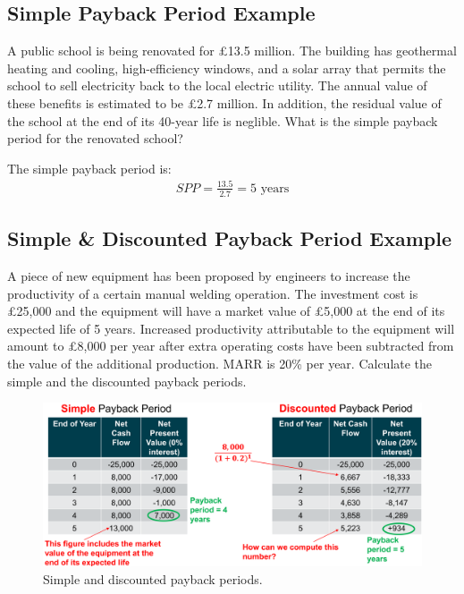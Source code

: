 \documentclass[class=report, crop=false, 12pt,a4paper]{standalone}
\begin{document}
\subsection{Simple Payback Period Example}
A public school is being renovated for £13.5 million. The building has geothermal heating and cooling, high-efficiency windows, and a solar array that permits the school to sell electricity back to the local electric utility. The annual value of these benefits is estimated to be £2.7 million. In addition, the residual value of the school at the end of its 40-year life is neglible. What is the simple payback period for the renovated school?

The simple payback period is:
\begin{gather}
	SPP = \frac{13.5}{2.7} = 5 \textrm{ years}
\end{gather}
\subsection{Simple \& Discounted Payback Period Example}
A piece of new equipment has been proposed by engineers to increase the productivity of a certain manual welding operation. The investment cost is £25,000 and the equipment will have a market value of £5,000 at the end of its expected life of 5 years. Increased productivity attributable to the equipment will amount to £8,000 per year after extra operating costs have been subtracted from the value of the additional production. MARR is 20\% per year. Calculate the simple and the discounted payback periods.
\begin{figure}[H]
	\centering
	\includegraphics[width = \textwidth]{../img/figure24.png}
	\caption{Simple and discounted payback periods.}
\end{figure}
\end{document}
